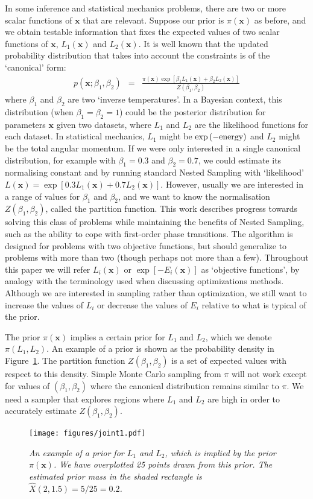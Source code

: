 \documentclass[journal,article,accept,moreauthors,pdftex,12pt,a4paper]{mdpi}
\newcommand{\xx}{\boldsymbol{x}}
\begin{document}
In some inference and
statistical mechanics problems, there are two or more scalar functions of
$\xx$ that are relevant. Suppose our prior is $\pi(\xx)$ as before, and
we obtain testable information that fixes the expected values of two scalar
functions of $\xx$, $L_1(\xx)$ and $L_2(\xx)$.
It is well known that the
updated probability distribution that takes into account the constraints is
of the `canonical' form:
\begin{eqnarray}
p(\xx; \beta_1, \beta_2) &=& \frac{\pi(\xx)\exp\left[\beta_1L_1(\xx)+\beta_2L_2(\xx)\right]}
{Z(\beta_1, \beta_2)}
\end{eqnarray}
where $\beta_1$ and $\beta_2$ are two `inverse temperatures'. In a Bayesian
context, this distribution (when $\beta_1 = \beta_2 = 1$) could be the
posterior distribution for parameters $\xx$
given two datasets, where $L_1$ and $L_2$ are the
likelihood functions for each dataset. In statistical mechanics, $L_1$ might
be $\exp\left(-\textnormal{energy}\right)$ and $L_2$ might be the total
angular momentum.
If we were only interested in a single canonical distribution, for example
with $\beta_1 = 0.3$ and $\beta_2 = 0.7$, we could estimate its normalising
constant and by running standard Nested Sampling with `likelihood'
$L(\xx) = \exp\left[0.3L_1(\xx) + 0.7L_2(\xx)\right]$. However, usually we
are interested in a range of values for $\beta_1$ and $\beta_2$, and we
want to know the normalisation $Z(\beta_1, \beta_2)$, called the
partition function. This work describes
progress towards solving this class of problems while maintaining the benefits
of Nested Sampling, such as the ability to cope with first-order phase
transitions. The algorithm is designed for problems with two objective
functions, but should generalize to problems with more than two (though perhaps
not more than a few). Throughout this paper we will refer $L_i(\xx)$ or
$\exp\left[-E_i(\xx)\right]$ as `objective functions',
by analogy with the terminology used when
discussing optimizations methods. Although we are interested in sampling rather
than optimization, we still want to increase the values of $L_i$ or decrease
the values of $E_i$ relative to what is typical of the prior.

The prior $\pi(\xx)$ implies a certain prior for $L_1$ and $L_2$, which we
denote $\pi(L_1, L_2)$. An example of a prior is shown as the
probability density in Figure~\ref{fig:joint1}. The partition function
$Z(\beta_1, \beta_2)$ is a set of expected values with respect to this density.
Simple Monte Carlo sampling from $\pi$ will not work except for values of
$(\beta_1, \beta_2)$ where the canonical distribution remains similar to $\pi$.
We need a sampler that explores regions where $L_1$ and $L_2$ are high in order
to accurately estimate $Z(\beta_1, \beta_2)$.
\begin{figure}
\centering
\texttt{[image: figures/joint1.pdf]}
\caption{\it An example of a prior for $L_1$ and $L_2$, which is implied by
the prior $\pi(\xx)$. We have overplotted 25 points drawn from this prior.
The estimated prior mass in the shaded rectangle is
$\hat{X}(2, 1.5) = 5/25 = 0.2$.
\label{fig:joint1}}
\end{figure}
\end{document}
